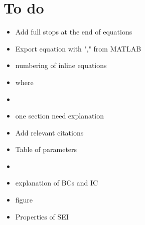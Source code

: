 \chapter{To do}

{\color{blue}
\begin{itemize}
    \item {\color{magenta}Add full stops at the end of equations}
    \item Export equation with "," from MATLAB
    \item {\color{magenta}numbering of inline equations}
    \item {\color{magenta}where}
    \item {\color{magenta}{unwanted vertical space}}
    \item one section need explanation
    \item Add relevant citations
    \item {\color{magenta}Table of parameters}
    \item {\color{magenta}{Write about SEI as well}}
    \item {\color{magenta}explanation of BCs and IC}
    \item {\color{magenta}figure}
    \item {\color{magenta}Properties of SEI}
\end{itemize}}